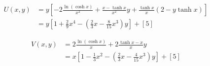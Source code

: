 \documentclass{article}
\begin{document}
\begin{align*}
U(x,y) &= y \left[ -2 \frac{\ln(\cosh x)}{x^2} + \frac{x - \tanh x}{x^2} y + \frac{\tanh x}{x} (2 - y \tanh x) \right] \\
       &= y \left[ 1 + \frac{2}{9} x^4 - \left( \frac{2}{3} x - \frac{8}{15} x^3 \right) y \right] + [5]
\end{align*}

\begin{align*}
V(x,y) &= 2 \frac{\ln(\cosh x)}{x} + 2 \frac{\tanh x - x}{x} y \\
       &= x \left[ 1 - \frac{1}{3} x^2 - \left( \frac{2}{3} x - \frac{4}{15} x^3 \right) y \right] + [5]
\end{align*}
\end{document}
